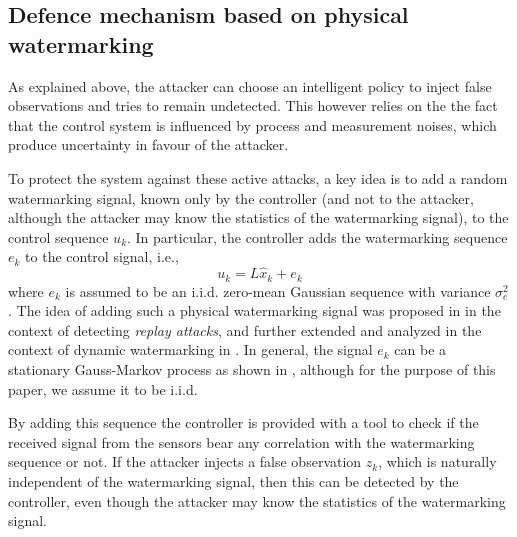 \documentclass[journal,10pt]{IEEEtran}
\begin{document}
\subsection{Defence mechanism based on physical watermarking}
As explained above, the attacker can choose an intelligent policy to inject  false observations and tries to remain undetected. This however relies on the the fact that the control system is influenced by process  and measurement noises, which produce uncertainty in favour of the
attacker. 

To protect the system against these active attacks, a key idea is to add a random watermarking  signal, known only by the controller (and not to the attacker, although the attacker may know the statistics of the watermarking signal), to the
control sequence $u_{k}$. In particular, the controller adds the watermarking sequence $e_{k}$ to the control signal,
i.e., 
\begin{equation}
u_{k}=L\hat{x}_{k}+e_{k}\label{uwithw}
\end{equation}
where $e_{k}$ is assumed to be an i.i.d. zero-mean Gaussian sequence with variance
$\sigma_{e}^{2}$. The idea of adding such a physical watermarking signal was proposed in \cite{mo_sinopoli_15} in the context of detecting {\em replay attacks}, and further extended and analyzed in the context of dynamic watermarking 
in \cite{kumar}. In general, the signal $e_{k}$ can be a stationary Gauss-Markov process as shown in 
\cite{mo_sinopoli_15}, although for the purpose of this paper, we assume it to be i.i.d.

By adding this sequence the controller is provided  with a tool to check if the received signal from the sensors bear any correlation with the watermarking sequence or not. If the attacker injects a false observation $z_{k}$, which is naturally independent of the watermarking signal, then this can be detected by the controller, even though the attacker may know the statistics of the
watermarking signal.
\end{document}
